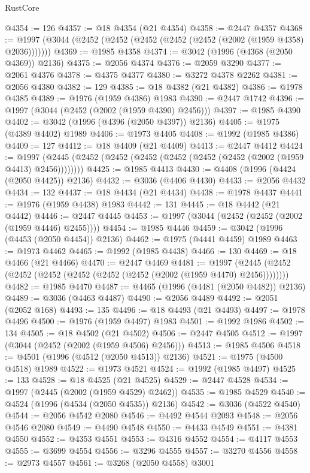 \begin{lexlean}{RustCore}
\begin{coremodule}
@4354 := 126
@4357 := @18 @4354 (@21 @4354)
@4358 := @2447 @4357
@4368 := @1997 (@3044 (@2452 (@2452 (@2452 (@2452 (@2452 (@2002 (@1959 @4358) @2036)))))))
@4369 := @1985 @4358
@4374 := @3042 (@1996 (@4368 (@2050 @4369)) @2136)
@4375 := @2056 @4374
@4376 := @2059 @3290
@4377 := @2061 @4376
@4378 := @4375 @4377
@4380 := @3272 @4378 @2262
@4381 := @2056 @4380
@4382 := 129
@4385 := @18 @4382 (@21 @4382)
@4386 := @1978 @4385
@4389 := @1976 (@1959 @4386) @1983
@4390 := @2447 @1742
@4396 := @1997 (@3044 (@2452 (@2002 (@1959 @4390) @2456)))
@4397 := @1985 @4390
@4402 := @3042 (@1996 (@4396 (@2050 @4397)) @2136)
@4405 := @1975 (@4389 @4402) @1989
@4406 := @1973 @4405
@4408 := @1992 (@1985 @4386)
@4409 := 127
@4412 := @18 @4409 (@21 @4409)
@4413 := @2447 @4412
@4424 := @1997 (@2445 (@2452 (@2452 (@2452 (@2452 (@2452 (@2452 (@2002 (@1959 @4413) @2456))))))))
@4425 := @1985 @4413
@4430 := @4408 (@1996 (@4424 (@2050 @4425)) @2136)
@4432 := @3036 (@4406 @4430)
@4433 := @2056 @4432
@4434 := 132
@4437 := @18 @4434 (@21 @4434)
@4438 := @1978 @4437
@4441 := @1976 (@1959 @4438) @1983
@4442 := 131
@4445 := @18 @4442 (@21 @4442)
@4446 := @2447 @4445
@4453 := @1997 (@3044 (@2452 (@2452 (@2002 (@1959 @4446) @2455))))
@4454 := @1985 @4446
@4459 := @3042 (@1996 (@4453 (@2050 @4454)) @2136)
@4462 := @1975 (@4441 @4459) @1989
@4463 := @1973 @4462
@4465 := @1992 (@1985 @4438)
@4466 := 130
@4469 := @18 @4466 (@21 @4466)
@4470 := @2447 @4469
@4481 := @1997 (@2445 (@2452 (@2452 (@2452 (@2452 (@2452 (@2452 (@2002 (@1959 @4470) @2456))))))))
@4482 := @1985 @4470
@4487 := @4465 (@1996 (@4481 (@2050 @4482)) @2136)
@4489 := @3036 (@4463 @4487)
@4490 := @2056 @4489
@4492 := @2051 (@2052 @168)
@4493 := 135
@4496 := @18 @4493 (@21 @4493)
@4497 := @1978 @4496
@4500 := @1976 (@1959 @4497) @1983
@4501 := @1992 @1986
@4502 := 134
@4505 := @18 @4502 (@21 @4502)
@4506 := @2447 @4505
@4512 := @1997 (@3044 (@2452 (@2002 (@1959 @4506) @2456)))
@4513 := @1985 @4506
@4518 := @4501 (@1996 (@4512 (@2050 @4513)) @2136)
@4521 := @1975 (@4500 @4518) @1989
@4522 := @1973 @4521
@4524 := @1992 (@1985 @4497)
@4525 := 133
@4528 := @18 @4525 (@21 @4525)
@4529 := @2447 @4528
@4534 := @1997 (@2445 (@2002 (@1959 @4529) @2462))
@4535 := @1985 @4529
@4540 := @4524 (@1996 (@4534 (@2050 @4535)) @2136)
@4542 := @3036 (@4522 @4540)
@4544 := @2056 @4542 @2080
@4546 := @4492 @4544 @2093
@4548 := @2056 @4546 @2080
@4549 := @4490 @4548
@4550 := @4433 @4549
@4551 := @4381 @4550
@4552 := @4353 @4551
@4553 := @4316 @4552
@4554 := @4117 @4553
@4555 := @3699 @4554
@4556 := @3296 @4555
@4557 := @3270 @4556
@4558 := @2973 @4557
@4561 := @3268 (@2050 @4558) @3001

\end{coremodule}
\end{lexlean}
